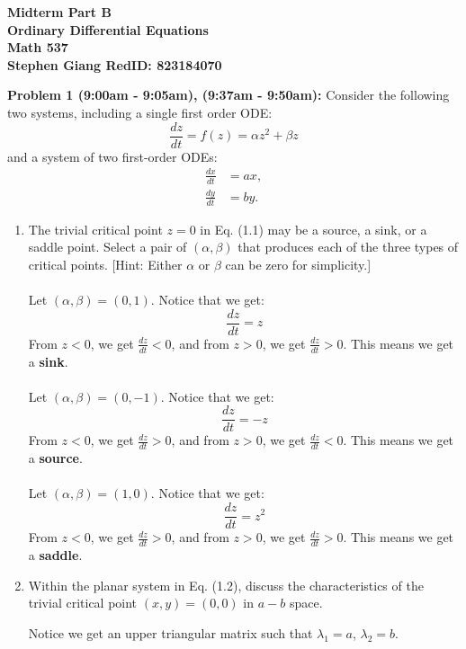 \documentclass[11pt]{article}
\newcommand{\skipline}{\vspace{\baselineskip}}
\newenvironment{problem}[1]{\textbf{Problem #1: }}{\newpage}
\begin{document}
	
	\begin{center}
		\textbf{Midterm Part B} \\
		\textbf{Ordinary Differential Equations} \\
		\textbf{Math 537} \\
		\textbf{Stephen Giang RedID: 823184070} \\
		\skipline \skipline
	\end{center}

	\begin{problem}{1 (9:00am - 9:05am), (9:37am - 9:50am)}
		Consider the following two systems, including a single first order ODE:
		\[\frac{dz}{dt} = f(z) = \alpha z^2 + \beta z \tag{1.1}\]
		and a system of two first-order ODEs:
		\begin{align*}
			\frac{dx}{dt} &= ax, \\
			\frac{dy}{dt} &= by. \tag{1.2}
		\end{align*}
		\begin{enumerate}[label = (\alph*)]
			\item  The trivial critical point $z = 0$ in Eq. (1.1) may be a source,
			a sink, or a saddle point. Select a pair of $(\alpha, \beta)$ that produces each of
			the three types of critical points. [Hint: Either $\alpha$ or $\beta$ can be zero for
			simplicity.]
			\\ \\
			Let $(\alpha, \beta) = (0, 1)$.  Notice that we get:
			\[\frac{dz}{dt} = z\]
			From $z < 0$, we get $\frac{dz}{dt} < 0$, and from $z > 0$, we get $\frac{dz}{dt} > 0$.  This means we get a \textbf{sink}.
			\\ \\
			Let $(\alpha, \beta) = (0, -1)$.  Notice that we get:
			\[\frac{dz}{dt} = -z\]
			From $z < 0$, we get $\frac{dz}{dt} > 0$, and from $z > 0$, we get $\frac{dz}{dt} < 0$.  This means we get a \textbf{source}.
			\\ \\
			Let $(\alpha, \beta) = (1, 0)$.  Notice that we get:
			\[\frac{dz}{dt} = z^2\]
			From $z < 0$, we get $\frac{dz}{dt} > 0$, and from $z > 0$, we get $\frac{dz}{dt} > 0$.  This means we get a \textbf{saddle}. 
			\newpage
			\item Within the planar system in Eq. (1.2), discuss the characteristics of the trivial critical point $(x, y) = (0, 0)$ in $a - b$ space.

			\skipline
			Notice we get an upper triangular matrix such that $\lambda_1 = a$, $\lambda_2 = b$. \\ \\
			

\end{enumerate}
\end{problem}
\end{document}
